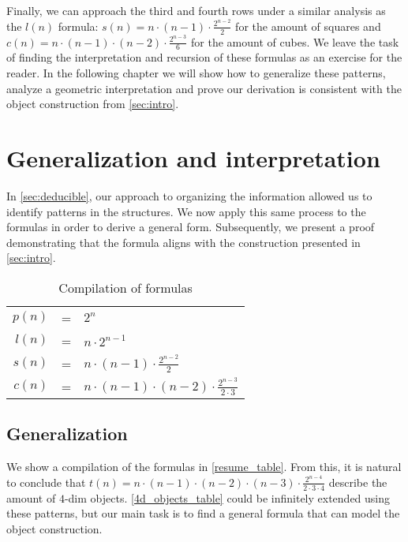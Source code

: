 \documentclass{article}
\begin{document}
	Finally, we can approach the third and fourth rows under a similar analysis as the $l(n)$ formula: $s(n) = n\cdot(n-1)\cdot\frac{2^{n-2}}{2}$ for the amount of squares and $c(n) = n\cdot(n-1)\cdot(n-2)\cdot\frac{2^{n-3}}{6}$ for the amount of cubes. We leave the task of finding the interpretation and recursion of these formulas as an exercise for the reader. In the following chapter we will show how to generalize these patterns, analyze a geometric interpretation and prove our derivation is consistent with the object construction from \autoref{sec:intro}.
	
	\section{Generalization and interpretation \label{sec:generalization}}
	
	In \autoref{sec:deducible}, our approach to organizing the information allowed us to identify patterns in the structures. We now apply this same process to the formulas in order to derive a general form. Subsequently, we present a proof demonstrating that the formula aligns with the construction presented in \autoref{sec:intro}.
	
	\begin{table}[ht]
		\centering
		\begin{tabular}{r c l}
			
			$p(n)$ & = &$ 2^{n}$ \\[0.7ex]
			$l(n)$ & = &$ n \cdot 2^{n-1}$ \\[0.4ex]
			$s(n)$ & = &$ n\cdot(n-1)\cdot\frac{2^{n-2}}{2}$\\[0.4ex]
			$c(n)$ & = &$ n \cdot (n-1) \cdot (n-2) \cdot \frac{2^{n-3}}{2 \cdot 3}$%
		\end{tabular}
		\caption{Compilation of formulas}
		\label{resume_table}
	\end{table}
	
	\subsection{Generalization}
	
	We show a compilation of the formulas in \autoref{resume_table}. From this, it is natural to conclude that $t(n) = n\cdot(n-1)\cdot(n-2)\cdot(n-3)\cdot\frac{2^{n-4}}{2 \cdot 3 \cdot 4}$ describe the amount of $4$-dim objects. \autoref{4d_objects_table} could be infinitely extended using these patterns, but our main task is to find a general formula that can model the object construction.
	
\end{document}
